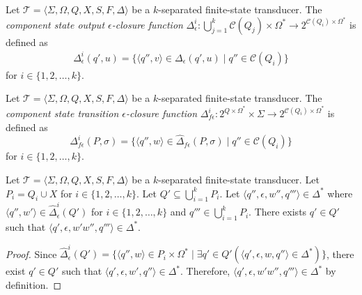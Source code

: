 \begin{definition}
  Let $\mathcal{T} = \langle \Sigma, \Omega, Q, X, S, F, \Delta \rangle$ be a
  $k$-separated finite-state transducer. The \emph{component state output
  $\epsilon$-closure function} $\Delta_\epsilon^i : \bigcup_{j=1}^k \mathcal{C}(Q_j)
  \times \Omega^* \rightarrow 2^{\mathcal{C}(Q_i) \times \Omega^*}$ is defined as
  \begin{align*}
    \Delta_\epsilon^i(q', u) = \{ \langle q'', v \rangle \in \Delta_\epsilon(q', u)
    \mid q'' \in \mathcal{C}(Q_i) \}
  \end{align*}
  for $i \in \{ 1, 2, \ldots, k \}$.
\end{definition}

\begin{definition}
  Let $\mathcal{T} = \langle \Sigma, \Omega, Q, X, S, F, \Delta \rangle$ be a
  $k$-separated finite-state transducer. The \emph{component state transition
  $\epsilon$-closure function} $\Delta_{f\epsilon}^i : 2^{Q \times \Omega^*} \times
  \Sigma \rightarrow 2^{\mathcal{C}(Q_i) \times \Omega^*}$ is defined as
  \begin{equation*}
    \Delta_{f\epsilon}^i(P, \sigma) = \{ \langle q'', w \rangle \in
    \hat{\Delta}_{f\epsilon}(P, \sigma) \mid q'' \in \mathcal{C}(Q_i) \}
  \end{equation*}
  for $i \in \{ 1, 2, \ldots, k \}$.
\end{definition}

\iffalse
\begin{proposition}
  Let $\mathcal{T} = \langle \Sigma, \Omega, Q, X, S, F, \Delta \rangle$ be a
  $k$-separated finite-state transducer. Let $P_i = Q_i \cup X$ for $i \in \{ 1, 2,
  \ldots, k \}$. Let $Q' \subseteq \bigcup_{i=1}^k P_i$. Let $\langle q'', \epsilon,
  w'', q''' \rangle \in \Delta^*$ where $\langle q'', w' \rangle \in
  \hat{\Delta}_\epsilon^i(Q')$ for $i \in \{ 1, 2, \ldots, k \}$ and $q''' \in
  \bigcup_{i=1}^k P_i$. There exists $q' \in Q'$ such that $\langle q', \epsilon,
  w'w'', q''' \rangle \in \Delta^*$.
\end{proposition}

\begin{proof}
  Since $\hat{\Delta}_\epsilon^i(Q') = \{ \langle q'', w \rangle \in P_i \times
  \Omega^* \mid \exists q' \in Q' (\langle q', \epsilon, w, q'' \rangle \in \Delta^*)
  \}$, there exist $q' \in Q'$ such that $\langle q', \epsilon, w', q'' \rangle \in
  \Delta^*$. Therefore, $\langle q', \epsilon, w'w'', q''' \rangle \in \Delta^*$ by
  definition.
\end{proof}

